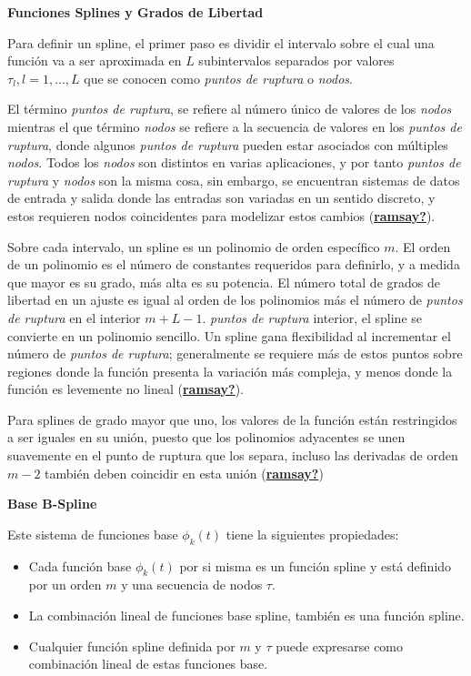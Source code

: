 \documentclass[
]{book}
\begin{document}
\textbf{Funciones Splines y Grados de Libertad}

Para definir un spline, el primer paso es dividir el intervalo sobre el cual una función va a ser aproximada en \(L\) subintervalos separados por valores \(\tau_l, l=1,...,L\) que se conocen como \emph{puntos de ruptura} o \emph{nodos}.

El término \emph{puntos de ruptura}, se refiere al número único de valores de los \emph{nodos} mientras el que término \emph{nodos} se refiere a la secuencia de valores en los \emph{puntos de ruptura}, donde algunos \emph{puntos de ruptura} pueden estar asociados con múltiples \emph{nodos}. Todos los \emph{nodos} son distintos en varias aplicaciones, y por tanto \emph{puntos de ruptura} y \emph{nodos} son la misma cosa, sin embargo, se encuentran sistemas de datos de entrada y salida donde las entradas son variadas en un sentido discreto, y estos requieren nodos coincidentes para modelizar estos cambios (\protect\hyperlink{ref-ramsay}{\textbf{ramsay?}}).

Sobre cada intervalo, un spline es un polinomio de orden específico \(m\). El orden de un polinomio es el número de constantes requeridos para definirlo, y a medida que mayor es su grado, más alta es su potencia. El número total de grados de libertad en un ajuste es igual al orden de los polinomios más el número de \emph{puntos de ruptura} en el interior \(m+L-1\). \emph{puntos de ruptura} interior, el spline se convierte en un polinomio sencillo. Un spline gana flexibilidad al incrementar el número de \emph{puntos de ruptura}; generalmente se requiere más de estos puntos sobre regiones donde la función presenta la variación más compleja, y menos donde la función es levemente no lineal (\protect\hyperlink{ref-ramsay}{\textbf{ramsay?}}).

Para splines de grado mayor que uno, los valores de la función están restringidos a ser iguales en su unión, puesto que los polinomios adyacentes se unen suavemente en el punto de ruptura que los separa, incluso las derivadas de orden \(m-2\) también deben coincidir en esta unión (\protect\hyperlink{ref-ramsay}{\textbf{ramsay?}})

\textbf{Base B-Spline}

Este sistema de funciones base \(\phi_k(t)\) tiene la siguientes propiedades:

\begin{itemize}
\item
  Cada función base \(\phi_k(t)\) por si misma es un función spline y está definido por un orden \(m\) y una secuencia de nodos \(\tau\).
\item
  La combinación lineal de funciones base spline, también es una función spline.
\item
  Cualquier función spline definida por \(m\) y \(\tau\) puede expresarse como combinación lineal de estas funciones base.
\end{itemize}
\end{document}
